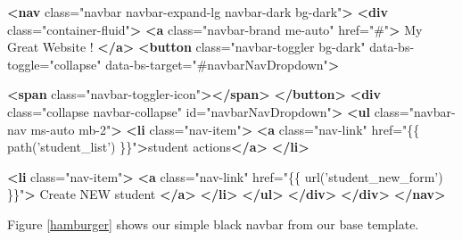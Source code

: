 \documentclass[a4paperpaper,openright]{book}
\newenvironment{Shaded}{}{}
\newcommand{\KeywordTok}[1]{\textcolor[rgb]{0.00,0.44,0.13}{\textbf{#1}}}
\newcommand{\NormalTok}[1]{#1}
\newcommand{\OtherTok}[1]{\textcolor[rgb]{0.00,0.44,0.13}{#1}}
\newcommand{\StringTok}[1]{\textcolor[rgb]{0.25,0.44,0.63}{#1}}
\begin{document}
\begin{Shaded}
\begin{Highlighting}[]
    \KeywordTok{<nav}\OtherTok{ class=}\StringTok{"navbar navbar-expand-lg navbar-dark bg-dark"}\KeywordTok{>}
        \KeywordTok{<div}\OtherTok{ class=}\StringTok{"container-fluid"}\KeywordTok{>}
            \KeywordTok{<a}\OtherTok{ class=}\StringTok{"navbar-brand me-auto"}\OtherTok{ href=}\StringTok{"#"}\KeywordTok{>}
\NormalTok{                My Great Website !}
            \KeywordTok{</a>}
            \KeywordTok{<button}\OtherTok{ class=}\StringTok{"navbar-toggler bg-dark"}\OtherTok{ data-bs-toggle=}\StringTok{"collapse"}
\OtherTok{                data-bs-target=}\StringTok{"#navbarNavDropdown"}\KeywordTok{>}

                \KeywordTok{<span}\OtherTok{ class=}\StringTok{"navbar-toggler-icon"}\KeywordTok{></span>}
            \KeywordTok{</button>}
            \KeywordTok{<div}\OtherTok{ class=}\StringTok{"collapse navbar-collapse"}\OtherTok{ id=}\StringTok{"navbarNavDropdown"}\KeywordTok{>}
                \KeywordTok{<ul}\OtherTok{ class=}\StringTok{"navbar-nav ms-auto mb-2"}\KeywordTok{>}
                    \KeywordTok{<li}\OtherTok{ class=}\StringTok{"nav-item"}\KeywordTok{>}
                        \KeywordTok{<a}\OtherTok{ class=}\StringTok{"nav-link"}\OtherTok{ href=}\StringTok{"\{\{ path('student_list') \}\}"}\KeywordTok{>}\NormalTok{student actions}\KeywordTok{</a>}
                    \KeywordTok{</li>}

                    \KeywordTok{<li}\OtherTok{ class=}\StringTok{"nav-item"}\KeywordTok{>}
                        \KeywordTok{<a}\OtherTok{ class=}\StringTok{"nav-link"}\OtherTok{ href=}\StringTok{"\{\{ url('student_new_form') \}\}"}\KeywordTok{>}
\NormalTok{                            Create NEW student}
                        \KeywordTok{</a>}
                    \KeywordTok{</li>}
                \KeywordTok{</ul>}
            \KeywordTok{</div>}
        \KeywordTok{</div>}
    \KeywordTok{</nav>}
\end{Highlighting}
\end{Shaded}

Figure \ref{hamburger} shows our simple black navbar from our base
template.
\end{document}
